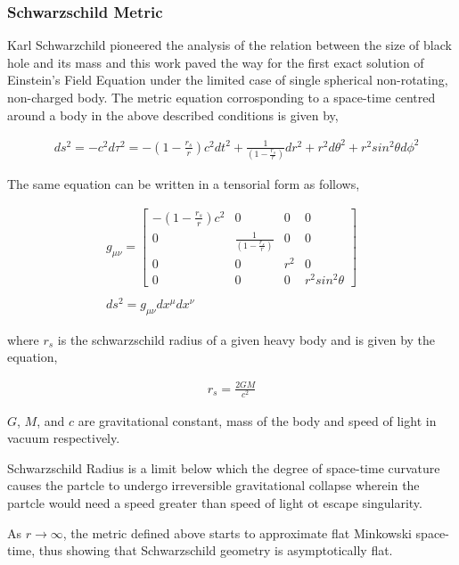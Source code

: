 \documentclass{aastex63}
\begin{document}
\subsubsection{Schwarzschild Metric} \label{subsubsec:sch}
Karl Schwarzchild pioneered the analysis of the relation between the size of black hole and its mass and this work paved the way for the first exact solution of Einstein's Field Equation under the limited case of single spherical non-rotating, non-charged body. 
The metric equation corrosponding to a space-time centred around a body in the above described conditions is given by,

\begin{align}
& ds^2 = -c^2 d\tau ^2 = - (1 - \frac{r_s}{r})c^2 dt^2  + \frac{1}{(1 - \frac{r_s}{r})}dr^2 + r^2 d\theta ^2 + r^2 sin^2 \theta d\phi ^2
\end{align}

The same equation can be written in a tensorial form as follows,

\begin{gather}
g_{\mu \nu} = \begin{bmatrix} - (1 - \frac{r_s}{r})c^2 & 0 & 0 & 0 \\ 0 & \frac{1}{(1 - \frac{r_s}{r})} & 0 & 0 \\ 0 & 0 & r^2 & 0 \\ 0 & 0 & 0 &  r^2 sin^2 \theta \end{bmatrix} \\ 
\nonumber \\
ds^2 = g_{\mu \nu} dx^\mu dx^\nu
\end{gather}

where $r_s$ is the schwarzschild radius of a given heavy body and is given by the equation,

\begin{gather}
r_s = \frac{2GM}{c^2}
\end{gather}

$G$, $M$, and $c$ are gravitational constant, mass of the body and speed of light in vacuum respectively.

Schwarzschild Radius is a limit below which the degree of space-time curvature causes the partcle to undergo irreversible gravitational collapse wherein the partcle would need a speed greater than speed of light ot escape singularity.

As $r \to \infty$, the metric defined above starts to approximate flat Minkowski space-time, thus showing that Schwarzschild geometry is asymptotically flat. 
\end{document}
